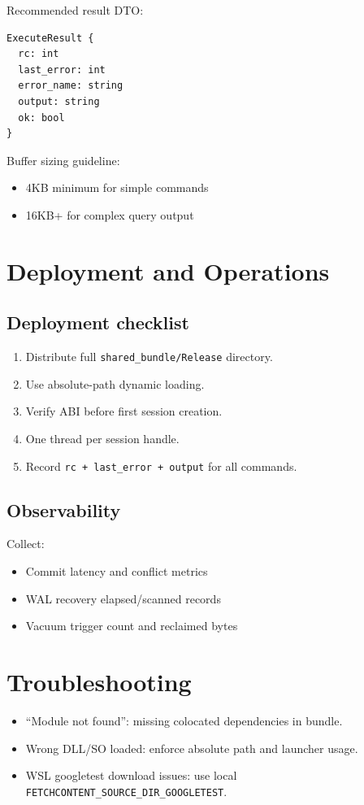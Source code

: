 \documentclass[11pt,a4paper]{article}
\begin{document}
Recommended result DTO:
\begin{lstlisting}
ExecuteResult {
  rc: int
  last_error: int
  error_name: string
  output: string
  ok: bool
}
\end{lstlisting}

Buffer sizing guideline:
\begin{itemize}
  \item 4KB minimum for simple commands
  \item 16KB+ for complex query output
\end{itemize}

\section{Deployment and Operations}
\subsection{Deployment checklist}
\begin{enumerate}
  \item Distribute full \texttt{shared\_bundle/Release} directory.
  \item Use absolute-path dynamic loading.
  \item Verify ABI before first session creation.
  \item One thread per session handle.
  \item Record \texttt{rc + last\_error + output} for all commands.
\end{enumerate}

\subsection{Observability}
Collect:
\begin{itemize}
  \item Commit latency and conflict metrics
  \item WAL recovery elapsed/scanned records
  \item Vacuum trigger count and reclaimed bytes
\end{itemize}

\section{Troubleshooting}
\begin{itemize}
  \item ``Module not found'': missing colocated dependencies in bundle.
  \item Wrong DLL/SO loaded: enforce absolute path and launcher usage.
  \item WSL googletest download issues: use local
  \texttt{FETCHCONTENT\_SOURCE\_DIR\_GOOGLETEST}.
\end{itemize}
\end{document}
